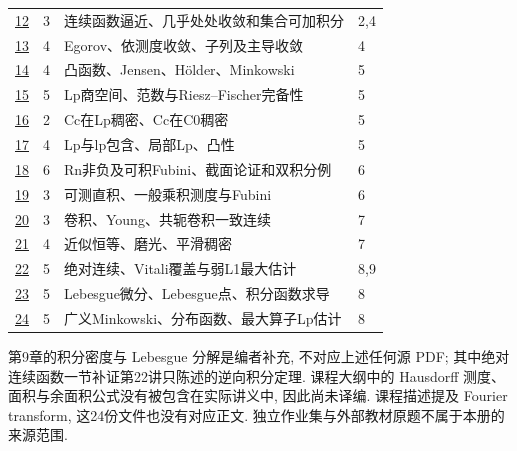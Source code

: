 \begin{longtable}{@{}p{}p{}p{}p{}@{}}
\href{https://ocw.mit.edu/courses/18-125-measure-and-integration-fall-2003/resources/18125_lec12/}{12} & 3 & 连续函数逼近、几乎处处收敛和集合可加积分 & 2,4 \\
\href{https://ocw.mit.edu/courses/18-125-measure-and-integration-fall-2003/resources/18125_lec13/}{13} & 4 & Egorov、依测度收敛、子列及主导收敛 & 4 \\
\href{https://ocw.mit.edu/courses/18-125-measure-and-integration-fall-2003/resources/18125_lec14/}{14} & 4 & 凸函数、Jensen、Hölder、Minkowski & 5 \\
\href{https://ocw.mit.edu/courses/18-125-measure-and-integration-fall-2003/resources/18125_lec15/}{15} & 5 & Lp商空间、范数与Riesz–Fischer完备性 & 5 \\
\href{https://ocw.mit.edu/courses/18-125-measure-and-integration-fall-2003/resources/18125_lec16/}{16} & 2 & Cc在Lp稠密、Cc在C0稠密 & 5 \\
\href{https://ocw.mit.edu/courses/18-125-measure-and-integration-fall-2003/resources/18125_lec17/}{17} & 4 & Lp与lp包含、局部Lp、凸性 & 5 \\
\href{https://ocw.mit.edu/courses/18-125-measure-and-integration-fall-2003/resources/18125_lec18/}{18} & 6 & Rn非负及可积Fubini、截面论证和双积分例 & 6 \\
\href{https://ocw.mit.edu/courses/18-125-measure-and-integration-fall-2003/resources/18125_lec19/}{19} & 3 & 可测直积、一般乘积测度与Fubini & 6 \\
\href{https://ocw.mit.edu/courses/18-125-measure-and-integration-fall-2003/resources/18125_lec20/}{20} & 3 & 卷积、Young、共轭卷积一致连续 & 7 \\
\href{https://ocw.mit.edu/courses/18-125-measure-and-integration-fall-2003/resources/18125_lec21/}{21} & 4 & 近似恒等、磨光、平滑稠密 & 7 \\
\href{https://ocw.mit.edu/courses/18-125-measure-and-integration-fall-2003/resources/18125_lec22/}{22} & 5 & 绝对连续、Vitali覆盖与弱L1最大估计 & 8,9 \\
\href{https://ocw.mit.edu/courses/18-125-measure-and-integration-fall-2003/resources/18125_lec23/}{23} & 5 & Lebesgue微分、Lebesgue点、积分函数求导 & 8 \\
\href{https://ocw.mit.edu/courses/18-125-measure-and-integration-fall-2003/resources/18125_lec24/}{24} & 5 & 广义Minkowski、分布函数、最大算子Lp估计 & 8 \\
\bottomrule
\end{longtable}
第9章的积分密度与 Lebesgue 分解是编者补充, 不对应上述任何源 PDF; 其中绝对连续函数一节补证第22讲只陈述的逆向积分定理. 课程大纲中的 Hausdorff 测度、面积与余面积公式没有被包含在实际讲义中, 因此尚未译编. 课程描述提及 Fourier transform, 这24份文件也没有对应正文. 独立作业集与外部教材原题不属于本册的来源范围.
